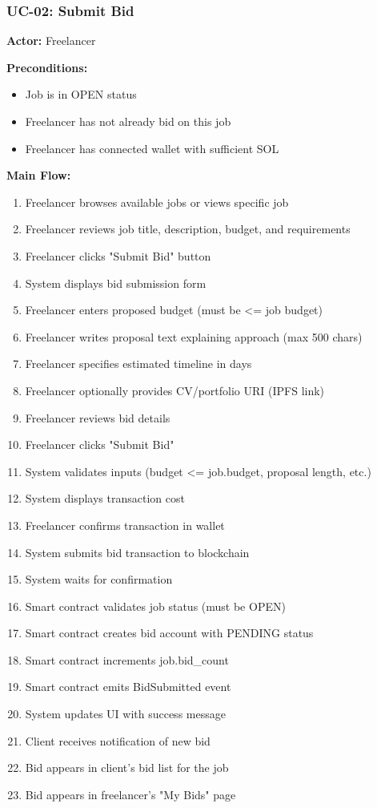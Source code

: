 \documentclass[a4paper,13pt,twoside]{report}
\theoremstyle{definition}
\begin{document}
\subsubsection{UC-02: Submit Bid}

\textbf{Actor:} Freelancer

\textbf{Preconditions:}
\begin{itemize}
    \item Job is in OPEN status
    \item Freelancer has not already bid on this job
    \item Freelancer has connected wallet with sufficient SOL
\end{itemize}

\textbf{Main Flow:}
\begin{enumerate}
    \item Freelancer browses available jobs or views specific job
    \item Freelancer reviews job title, description, budget, and requirements
    \item Freelancer clicks "Submit Bid" button
    \item System displays bid submission form
    \item Freelancer enters proposed budget (must be <= job budget)
    \item Freelancer writes proposal text explaining approach (max 500 chars)
    \item Freelancer specifies estimated timeline in days
    \item Freelancer optionally provides CV/portfolio URI (IPFS link)
    \item Freelancer reviews bid details
    \item Freelancer clicks "Submit Bid"
    \item System validates inputs (budget <= job.budget, proposal length, etc.)
    \item System displays transaction cost
    \item Freelancer confirms transaction in wallet
    \item System submits bid transaction to blockchain
    \item System waits for confirmation
    \item Smart contract validates job status (must be OPEN)
    \item Smart contract creates bid account with PENDING status
    \item Smart contract increments job.bid\_count
    \item Smart contract emits BidSubmitted event
    \item System updates UI with success message
    \item Client receives notification of new bid
    \item Bid appears in client's bid list for the job
    \item Bid appears in freelancer's "My Bids" page
\end{enumerate}
\end{document}
